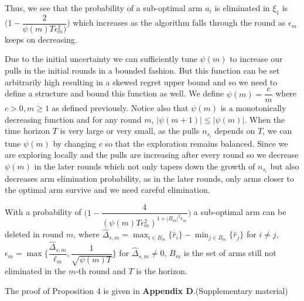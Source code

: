 \begin{remark}
	Thus, we see that the probability of a sub-optimal arm $a_{i}$ is eliminated in $\xi_{1}$ is  $\bigg(1-\dfrac{2}{\psi(m)T\epsilon_{m}^{2})}\bigg)$ which increases as the algorithm falls through the round as $\epsilon_{m}$ keeps on decreasing.
	
	Due to the initial uncertainty we can sufficiently tune $\psi(m)$ to increase our pulls in the initial rounds in a bounded fashion. But this function can be set arbitrarily high resulting in a skewed regret upper bound and so we need to define a structure and bound this function as well. We define $\psi(m)=\dfrac{c}{m}$ where $c>0, m\geq 1$ as defined previously. Notice also that $\psi(m)$ is a monotonically decreasing function and for any round $m$, $|\psi(m+1)|\leq |\psi(m)|$. 
When the time horizon $T$ is very large or very small, as the pulls $n_{s_{i}}$ depends on $T$, we can tune $\psi(m)$ by changing $c$ so that the exploration remains balanced. Since we are exploring locally and the pulls are increasing after every round so we decrease $\psi(m)$ in the later rounds which not only tapers down the growth of $n_{s_{i}}$ but also decreases arm elimination probability, as in the later rounds, only arms closer to the optimal arm survive and we need careful elimination.
\end{remark}
	
	
	

\begin{proposition}
With a probability of $\bigg(1-\dfrac{4}{(\psi(m)T\epsilon_{m}^{2})^{1+|B_{m}|^{2}\epsilon_{m}}}\bigg)$ a sub-optimal arm can be deleted in round $m$, where $\hat{\Delta}_{s,m}=\max_{i\in B_{m}}{\lbrace\hat{r}_{i}\rbrace}-\min_{j\in B_{m}}{\lbrace\hat{r}_{j}\rbrace}$ for $i\neq j$,  $\epsilon_{m}=\max{\bigg\lbrace\dfrac{\hat{\Delta}_{s,m}}{\ell_{m}}, \dfrac{1}{\sqrt{\psi{(m)T}}}\bigg\rbrace}$ for $\hat{\Delta}_{s,m}\neq 0$, $B_{m}$ is the set of arms still not eliminated in the $m$-th round and $T$ is the horizon.
\end{proposition}

	The proof of Proposition 4 is given in \textbf{Appendix D}.(Supplementary material)

